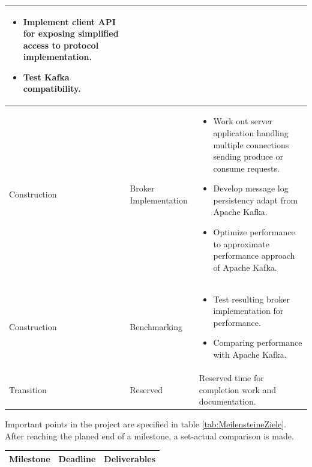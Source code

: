 \begin{tabular}[H]{|l|l|p{8cm}|}
\begin {itemize}
                messages. 
            \item Implement client API for exposing simplified access to protocol
                implementation.
            \item Test Kafka compatibility.
        \end{itemize} \\ \hline
    Construction & Broker Implementation &
        \begin{itemize}
            \item Work out server application handling multiple connections
            sending produce or consume requests.
            \item Develop message log persistency adapt from Apache Kafka. 
            \item Optimize performance to approximate performance approach of
            Apache Kafka. 
        \end{itemize} \\ \hline
    Construction & Benchmarking &
        \begin{itemize}
            \item Test resulting broker implementation for performance.
            \item Comparing performance with Apache Kafka.
        \end{itemize} \\ \hline
    Transition & Reserved & Reserved time for completion work and documentation.
    \\ \hline
\end{tabular}

Important points in the project are specified in table
\ref{tab:MeilensteineZiele}. After reaching the planed end of a milestone, a
set-actual comparison is made. 

\begin{tabular}[t]{|l|l|p{8cm}|}\hline
    \textbf{Milestone} & \textbf{Deadline} & \textbf{Deliverables} \\ \hline \hline
\end{tabular}
\label{tab:MeilensteineZiele}


